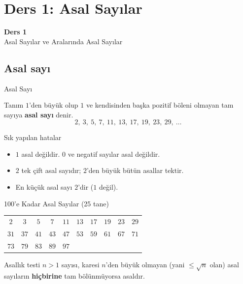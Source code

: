 \documentclass[aspectratio=169,11pt]{beamer}
\begin{document}
\section{Ders 1: Asal Sayılar}
\begin{frame}
\centering\Large\color{anamavi}\textbf{Ders 1}\\[6pt]\normalsize Asal Sayılar ve Aralarında Asal Sayılar
\end{frame}

\subsection{Asal sayı}
\begin{frame}{Asal Sayı}
\begin{block}{Tanım}
\(1\)'den büyük olup \(1\) ve kendisinden başka pozitif böleni olmayan tam sayıya \textbf{asal sayı} denir.
\[2,\ 3,\ 5,\ 7,\ 11,\ 13,\ 17,\ 19,\ 23,\ 29,\ \dots\]
\end{block}
\begin{alertblock}{Sık yapılan hatalar}
\begin{itemize}
\item \(1\) asal değildir. \(0\) ve negatif sayılar asal değildir.
\item \(2\) tek çift asal sayıdır; \(2\)'den büyük bütün asallar tektir.
\item En küçük asal sayı \(2\)'dir (\(1\) değil).
\end{itemize}
\end{alertblock}
\end{frame}

\begin{frame}{100'e Kadar Asal Sayılar (25 tane)}
\begin{center}
\large
\renewcommand{\arraystretch}{1.3}
\begin{tabular}{cccccccccc}
\toprule
\(2\) & \(3\) & \(5\) & \(7\) & \(11\) & \(13\) & \(17\) & \(19\) & \(23\) & \(29\)\\
\(31\) & \(37\) & \(41\) & \(43\) & \(47\) & \(53\) & \(59\) & \(61\) & \(67\) & \(71\)\\
\(73\) & \(79\) & \(83\) & \(89\) & \(97\) & & & & & \\\bottomrule
\end{tabular}
\end{center}
\begin{block}{Asallık testi}
\(n>1\) sayısı, karesi \(n\)'den büyük olmayan (yani \(\le\sqrt{n}\) olan) asal sayıların \textbf{hiçbirine} tam bölünmüyorsa asaldır.
\end{block}
\end{frame}
\end{document}
